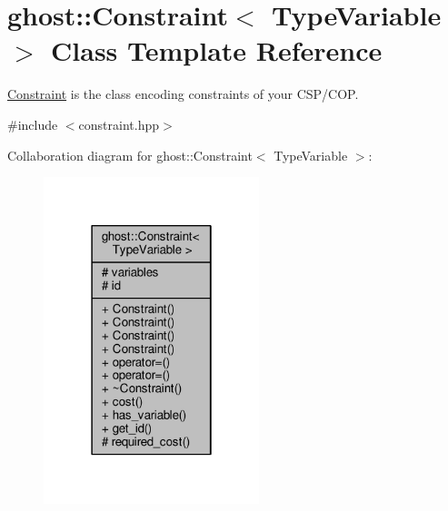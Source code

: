 \hypertarget{classghost_1_1Constraint}{}\section{ghost\+:\+:Constraint$<$ Type\+Variable $>$ Class Template Reference}
\label{classghost_1_1Constraint}


\hyperlink{classghost_1_1Constraint}{Constraint} is the class encoding constraints of your C\+S\+P/\+C\+OP.  




{\ttfamily \#include $<$constraint.\+hpp$>$}



Collaboration diagram for ghost\+:\+:Constraint$<$ Type\+Variable $>$\+:\nopagebreak
\begin{figure}[H]
\begin{center}
\leavevmode
\includegraphics[width=178pt]{classghost_1_1Constraint__coll__graph}
\end{center}
\end{figure}
